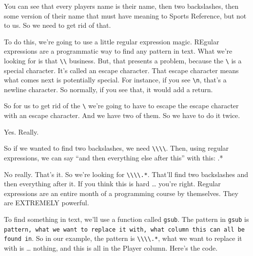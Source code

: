 \documentclass[]{book}
\newenvironment{Shaded}{\begin{snugshade}}{\end{snugshade}}
\newcommand{\CharTok}[1]{\textcolor[rgb]{0.31,0.60,0.02}{#1}}
\newcommand{\DataTypeTok}[1]{\textcolor[rgb]{0.13,0.29,0.53}{#1}}
\newcommand{\KeywordTok}[1]{\textcolor[rgb]{0.13,0.29,0.53}{\textbf{#1}}}
\newcommand{\NormalTok}[1]{#1}
\newcommand{\OperatorTok}[1]{\textcolor[rgb]{0.81,0.36,0.00}{\textbf{#1}}}
\newcommand{\StringTok}[1]{\textcolor[rgb]{0.31,0.60,0.02}{#1}}
\begin{document}
You can see that every players name is their name, then two backslashes, then some version of their name that must have meaning to Sports Reference, but not to us. So we need to get rid of that.

To do this, we're going to use a little regular expression magic. REgular expressions are a programmatic way to find any pattern in text. What we're looking for is that \texttt{\textbackslash{}\textbackslash{}} business. But, that presents a problem, because the \texttt{\textbackslash{}} is a special character. It's called an escape character. That escape character means what comes next is potentially special. For instance, if you see \texttt{\textbackslash{}n}, that's a newline character. So normally, if you see that, it would add a return.

So for us to get rid of the \texttt{\textbackslash{}} we're going to have to escape the escape character with an escape character. And we have two of them. So we have to do it twice.

Yes. Really.

So if we wanted to find two backslashes, we need \texttt{\textbackslash{}\textbackslash{}\textbackslash{}\textbackslash{}}. Then, using regular expressions, we can say ``and then everything else after this'' with this: .*

No really. That's it. So we're looking for \texttt{\textbackslash{}\textbackslash{}\textbackslash{}\textbackslash{}.*}. That'll find two backslashes and then everything after it. If you think this is hard \ldots{} you're right. Regular expressions are an entire month of a programming course by themselves. They are EXTREMELY powerful.

To find something in text, we'll use a function called \texttt{gsub}. The pattern in \texttt{gsub} is \texttt{pattern,\ what\ we\ want\ to\ replace\ it\ with,\ what\ column\ this\ can\ all\ be\ found\ in}. So in our example, the pattern is \texttt{\textbackslash{}\textbackslash{}\textbackslash{}\textbackslash{}.*}, what we want to replace it with is \ldots{} nothing, and this is all in the Player column. Here's the code.

\begin{Shaded}
\end{Shaded}
\end{document}
